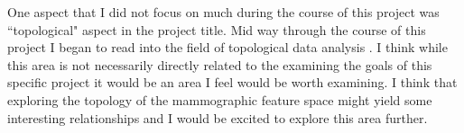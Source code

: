 One aspect that I did not focus on much during the course of this project was ``topological" aspect in the project title. Mid way through the course of this project I began to read into the field of topological data analysis \cite{carlsson2009topology}. I think while this area is not necessarily directly related to the examining the goals of this specific project it would be an area I feel would be worth examining. I think that exploring the topology of the mammographic feature space might yield some interesting relationships and I would be excited to explore this area further.

 